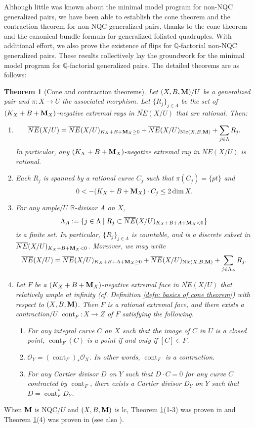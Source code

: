 \documentclass[11pt]{amsart}
\numberwithin{equation}{section}
\newcommand{\Mm}{{\bf{M}}}
\newcommand{\Qq}{\mathbb{Q}}
\newcommand{\Rr}{\mathbb{R}}
\newcommand{\Nlc}{\operatorname{Nlc}}
\newcommand{\cont}{\operatorname{cont}}
\newtheorem{thm}{Theorem}[subsection]
\theoremstyle{definition}
\theoremstyle{definition}
\theoremstyle{definition}
\begin{document}
Although little was known about the minimal model program for non-NQC generalized pairs, we have been able to establish the cone theorem and the contraction theorem for non-NQC generalized pairs, thanks to the cone theorem and the canonical bundle formula for generalized foliated quadruples. With additional effort, we also prove the existence of flips for $\Qq$-factorial non-NQC generalized pairs. These results collectively lay the groundwork for the minimal model program for $\Qq$-factorial generalized pairs. The detailed theorems are as follows:

\begin{thm}[Cone and contraction theorems]\label{thm: cone theorem nonnqc gpair}
Let $(X,B,\Mm)/U$ be a generalized pair and $\pi: X\rightarrow U$ the associated morphism. Let $\{R_j\}_{j\in\Lambda}$ be the set of $(K_{X}+B+\Mm_X)$-negative extremal rays in $\overline{NE}(X/U)$ that are rational. Then:
\begin{enumerate}
    \item $$\overline{NE}(X/U)=\overline{NE}(X/U)_{K_{X}+B+\Mm_X\geq 0}+\overline{NE}(X/U)_{\Nlc(X,B,\Mm)}+\sum_{j\in\Lambda} R_j.$$
    In particular, any $(K_{X}+B+\Mm_X)$-negative extremal ray in $\overline{NE}(X/U)$ is rational.
    \item Each $R_j$ is spanned by a rational curve $C_j$ such that $\pi(C_j)=\{pt\}$ and 
    $$0<-(K_{X}+B+\Mm_X)\cdot C_j\leq 2\dim X.$$
    \item For any ample$/U$ $\Rr$-divisor $A$ on $X$,
    $$\Lambda_A:=\{j\in\Lambda\mid R_j\subset\overline{NE}(X/U)_{K_{X}+B+A+\Mm_X<0}\}$$
    is a finite set. In particular, $\{R_j\}_{j\in\Lambda}$ is countable, and is a discrete subset in $\overline{NE}(X/U)_{K_{X}+B+\Mm_X<0}$. Moreover, we may write
    $$\overline{NE}(X/U)=\overline{NE}(X/U)_{K_{X}+B+A+\Mm_X\geq 0}+\overline{NE}(X/U)_{\Nlc(X,B,\Mm)}+\sum_{j\in\Lambda_A}R_j.$$
    \item Let $F$ be a $(K_X+B+\Mm_X)$-negative extremal face in $\overline{NE}(X/U)$ that relatively ample at infinity (cf. Definition \ref{defn: basics of cone theorem}) with respect to $(X,B,\Mm)$. Then $F$ is a rational extremal face, and there exists a contraction$/U$ $\cont_F: X\rightarrow Z$ of $F$ satisfying the following.
\begin{enumerate}
    \item For any integral curve $C$ on $X$ such that the image of $C$ in $U$ is a closed point, $\cont_F(C)$ is a point if and only if $[C]\in F$.
    \item $\mathcal{O}_Y=(\cont_F)_*\mathcal{O}_X$. In other words, $\cont_F$ is a contraction.
    \item For any Cartier divisor $D$ on $Y$ such that $D\cdot C=0$ for any curve $C$ contracted by $\cont_F$, there exists a Cartier divisor $D_Y$ on $Y$ such that $D=\cont_F^*D_Y$.
\end{enumerate}
\end{enumerate}
\end{thm}
When $\Mm$ is NQC$/U$ and $(X,B,\Mm)$ is lc, Theorem \ref{thm: cone theorem nonnqc gpair}(1-3) was proven in \cite[Theorem 1.3]{HL21a} and Theorem \ref{thm: cone theorem nonnqc gpair}(4) was proven in \cite[Theorem 1.5]{Xie22} (see also \cite[Theorem 1.7]{CLX23}).
\end{document}
